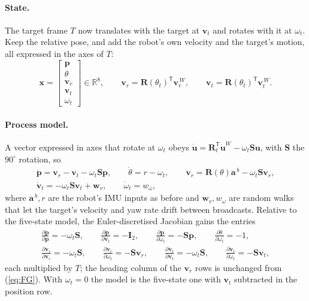 \documentclass[11pt,a4paper]{article}
\newcommand{\vect}[1]{\bm{#1}}
\newcommand{\mat}[1]{\bm{#1}}
\newcommand{\T}{^{\mathsf{T}}}
\newcommand{\Real}{\mathbb{R}}
\newcommand{\Rot}{\mat{R}}
\begin{document}
\paragraph{State.} The target frame $T$ now translates with the target at $\vect v_t$ and rotates with it at $\omega_t$. Keep the relative pose, and add the robot's own velocity and the target's motion, all expressed in the axes of $T$:
\begin{equation}
\vect x = \begin{bmatrix}\vect p \\ \theta \\ \vect v_r \\ \vect v_t \\ \omega_t\end{bmatrix}\in\Real^8,
\qquad
\vect v_r = \Rot(\theta_t)\T\vect v_r^{\,W},\qquad
\vect v_t = \Rot(\theta_t)\T\vect v_t^{\,W}.
\end{equation}

\paragraph{Process model.} A vector expressed in axes that rotate at $\omega_t$ obeys $\dot{\vect u} = \Rot_t\T\dot{\vect u}^{W} - \omega_t\mat S\vect u$, with $\mat S$ the $90^\circ$ rotation, so
\begin{gather}
\dot{\vect p} = \vect v_r - \vect v_t - \omega_t\mat S\vect p,\qquad
\dot\theta = r - \omega_t,\qquad
\dot{\vect v}_r = \Rot(\theta)\vect a^{\,b} - \omega_t\mat S\vect v_r,
\label{eq:coopmodel}\\
\dot{\vect v}_t = -\omega_t\mat S\vect v_t + \vect w_v,\qquad
\dot\omega_t = w_\omega,
\end{gather}
where $\vect a^{\,b}, r$ are the robot's IMU inputs as before and $\vect w_v, w_\omega$ are random walks that let the target's velocity and yaw rate drift between broadcasts. Relative to the five-state model, the Euler-discretised Jacobian gains the entries
\begin{gather}
\frac{\partial\dot{\vect p}}{\partial\vect p} = -\omega_t\mat S,\qquad
\frac{\partial\dot{\vect p}}{\partial\vect v_t} = -\mat I_2,\qquad
\frac{\partial\dot{\vect p}}{\partial\omega_t} = -\mat S\vect p,\qquad
\frac{\partial\dot\theta}{\partial\omega_t} = -1,\\
\frac{\partial\dot{\vect v}_r}{\partial\vect v_r} = -\omega_t\mat S,\qquad
\frac{\partial\dot{\vect v}_r}{\partial\omega_t} = -\mat S\vect v_r,\qquad
\frac{\partial\dot{\vect v}_t}{\partial\vect v_t} = -\omega_t\mat S,\qquad
\frac{\partial\dot{\vect v}_t}{\partial\omega_t} = -\mat S\vect v_t,
\end{gather}
each multiplied by $T$; the heading column of the $\vect v_r$ rows is unchanged from (\ref{eq:FG}). With $\omega_t=0$ the model is the five-state one with $\vect v_t$ subtracted in the position row.
\end{document}
